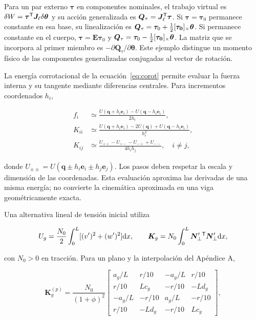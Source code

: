 Para un par externo $\bm\tau$ en componentes nominales, el trabajo virtual es $\delta W=\bm\tau^\mathsf T\bm J_\ell\delta\bm\theta$ y su acción generalizada es $\bm Q_\tau=\bm J_\ell^\mathsf T\bm\tau$. Si $\bm\tau=\bm\tau_0$ permanece constante en esa base, su linealización es $\bm Q_\tau=\bm\tau_0+\tfrac12[\bm{\tau_0}]_\times\bm\theta$. Si permanece constante en el cuerpo, $\bm\tau=\bm E\bm\tau_0$ y $\bm Q_\tau=\bm\tau_0-\tfrac12[\bm{\tau_0}]_\times\bm\theta$. La matriz que se incorpora al primer miembro es $-\partial\bm Q_\tau/\partial\bm\theta$. Este ejemplo distingue un momento físico de las componentes generalizadas conjugadas al vector de rotación.

La energía corrotacional de la ecuación~\eqref{eq:corot} permite evaluar la fuerza interna y su tangente mediante diferencias centrales. Para incrementos coordenados $h_i$,

\begin{align}
f_i&\simeq\frac{U(\bm q+h_i\bm e_i)-U(\bm q-h_i\bm e_i)}{2h_i},\nonumber\\
K_{ii}&\simeq\frac{U(\bm q+h_i\bm e_i)-2U(\bm q)+U(\bm q-h_i\bm e_i)}{h_i^2},\nonumber\\
K_{ij}&\simeq\frac{U_{++}-U_{+-}-U_{-+}+U_{--}}{4h_ih_j},\quad i\ne j,
\end{align}

donde $U_{\pm\pm}=U(\bm q\pm h_i\bm e_i\pm h_j\bm e_j)$. Los pasos deben respetar la escala y dimensión de las coordenadas. Esta evaluación aproxima las derivadas de una misma energía; no convierte la cinemática aproximada en una viga geométricamente exacta.

Una alternativa lineal de tensión inicial utiliza

\begin{equation}
U_g=\frac{N_0}2\int_0^L[(v')^2+(w')^2]\mathrm d x,
\qquad \bm K_g=N_0\int_0^L\bm N_\perp'{}^\mathsf T\bm N_\perp'\mathrm d x,
\end{equation}

con $N_0>0$ en tracción. Para un plano y la interpolación del Apéndice A,

\begin{equation}
\bm K_g^{(p)}=\frac{N_0}{(1+\phi)^2}\begin{bmatrix}
a_g/L&r/10&-a_g/L&r/10\\
r/10&Lc_g&-r/10&-Ld_g\\
-a_g/L&-r/10&a_g/L&-r/10\\
r/10&-Ld_g&-r/10&Lc_g
\end{bmatrix},
\end{equation}

